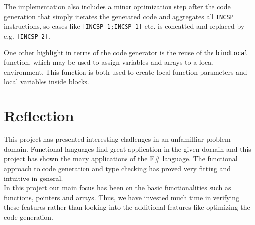 \documentclass[12pt]{article}
\begin{document}
The implementation also includes a minor optimization step after the code generation that simply iterates the generated code and aggregates all \texttt{INCSP} instructions, so cases like \texttt{[INCSP 1;INCSP 1]} etc. is concatted and replaced by e.g. \texttt{[INCSP 2]}. 

One other highlight in terms of the code generator is the reuse of the \texttt{bindLocal} function, which may be used to assign variables and arrays to a local environment. This function is both used to create local function parameters and local variables inside blocks.

\section{Reflection}
This project has presented interesting challenges in an unfamilliar problem domain. Functional languages find great application in the given domain and this project has shown the many applications of the F\# language. The functional approach to code generation and type checking has proved very fitting and intuitive in general.\\

In this project our main focus has been on the basic functionalities such as functions, pointers and arrays. Thus, we have invested much time in verifying these features rather than looking into the additional features like optimizing the code generation.
\end{document}
